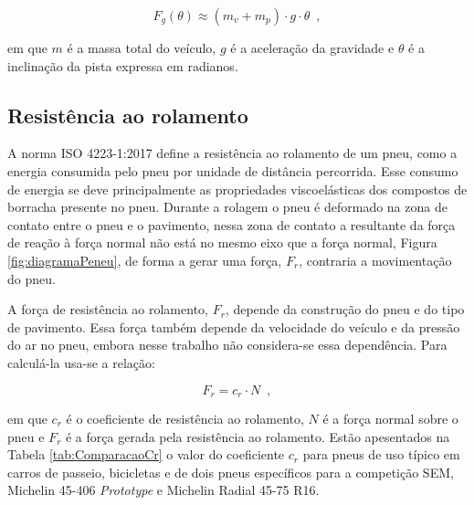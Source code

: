 \[
	F_{g}(\theta) \approx  (m_v + m_p) \cdot g \cdot \theta
	\enspace,
\]


em que $m$ é a massa total do veículo, $g$ é a aceleração da gravidade e $\theta$ é a inclinação da pista expressa em
radianos. \cite[Seç.~2.1.1]{book:guzzella2012vehicle}

\subsection{Resistência ao rolamento}
\label{subsec:resistencia_rolamento}

A norma ISO 4223-1:2017 define a resistência ao rolamento de um pneu, como a energia consumida pelo pneu por unidade de distância 
percorrida. Esse consumo de energia se deve principalmente as propriedades viscoelásticas dos compostos de borracha presente no pneu.
Durante a rolagem o pneu é deformado na zona de contato entre o pneu e o pavimento, nessa zona de contato a resultante da força de reação à força
normal não
está no mesmo eixo que a força normal, Figura \ref{fig:diagramaPeneu}, de forma a gerar uma força, $F_{r}$, contraria a movimentação do pneu.



A força de resistência ao rolamento, $F_{r}$, depende da construção do pneu e do tipo de pavimento. Essa força também depende da velocidade do
veículo e da pressão do ar no pneu,
embora nesse trabalho não considera-se essa dependência. Para calculá-la usa-se a relação:

\begin{equation}
	\label{eq:Fr}
	F_{r}  = c_{r} \cdot N
	\enspace,
\end{equation}

em que $c_{r}$ é o coeficiente de resistência ao rolamento, $N$ é a força normal sobre o pneu e $F_{r}$ é a força
gerada pela resistência ao rolamento.
Estão apesentados na Tabela \ref{tab:ComparacaoCr}
o valor do coeficiente $c_{r}$ para pneus de uso típico em carros de passeio, bicicletas e de dois pneus específicos para a competição SEM,
Michelin
45-406 \textit{Prototype} e Michelin  Radial 45-75 R16.


